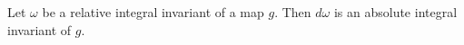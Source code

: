 Let $\omega$ be a relative integral invariant of a map $g$. Then $d\omega$ is an absolute integral invariant of $g$.
